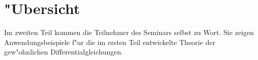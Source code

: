 %
%
%
\chapter*{"Ubersicht}
\rhead{}
\label{skript:uebersicht}
Im zweiten Teil kommen die Teilnehmer des Seminars selbst zu Wort.
Sie zeigen Anwendungsbeispiele f"ur die im ersten
Teil entwickelte Theorie der gew"ohnlichen Differentialgleichungen.


